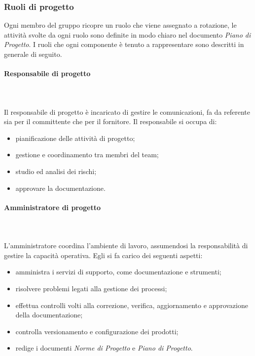 		\subsubsection{Ruoli di progetto}%
		Ogni membro del gruppo ricopre un ruolo che viene assegnato a rotazione, le attività svolte da ogni ruolo sono definite in modo chiaro nel documento \textit{Piano di Progetto}.
		I ruoli che ogni componente è tenuto a rappresentare sono descritti in generale di seguito.
			\paragraph{Responsabile di progetto} \mbox{}\\ \mbox{}\\
			Il responsabile di progetto è incaricato di gestire le comunicazioni, fa da referente sia per il committente che per il fornitore.\newline
			Il responsabile si occupa di:
			\begin{itemize}
				\item pianificazione delle attività di progetto;
				\item  gestione e coordinamento tra membri del team;
				\item studio ed analisi dei rischi;
				\item approvare la documentazione.
			\end{itemize}
			\paragraph{Amministratore di progetto} \mbox{}\\ \mbox{}\\
			L'amministratore coordina l'ambiente di lavoro, assumendosi la responsabilità di gestire la capacità operativa.\newline
			Egli si fa carico dei seguenti aspetti:
			\begin{itemize}
				\item amministra i servizi di supporto, come documentazione e strumenti;
				\item risolvere problemi legati alla gestione dei processi;
				\item effettua controlli volti alla correzione, verifica, aggiornamento e approvazione della documentazione;
				\item controlla versionamento e configurazione dei prodotti;
				\item redige i documenti \textit{Norme di Progetto} e \textit{Piano di Progetto}.
			\end{itemize}
